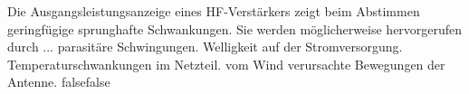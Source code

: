    {Die Ausgangsleistungsanzeige eines HF-Verstärkers zeigt beim Abstimmen geringfügige sprunghafte Schwankungen. Sie werden möglicherweise hervorgerufen durch ...}
    {parasitäre Schwingungen.}
    {Welligkeit auf der Stromversorgung.}
    {Temperaturschwankungen im Netzteil.}
    {vom Wind verursachte Bewegungen der Antenne.}
    {false}{false}